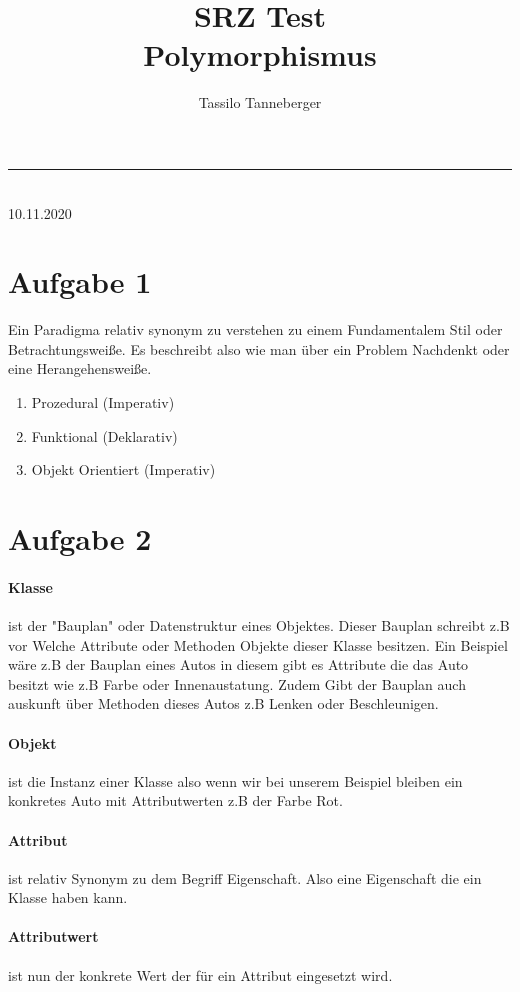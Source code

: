 \documentclass[12pt]{article}
\title{SRZ Test\\Polymorphismus}
\author{Tassilo Tanneberger}
\makeatletter
\newcommand{\linia}{\rule{\linewidth}{1pt}}
\renewcommand{\maketitle}{
\begin{center}
\huge \@title
\end{center}
\linia\\
{\large\@author\hfill 10.11.2020\\}}
\makeatother
\begin{document}
\maketitle

\section*{Aufgabe 1}

Ein Paradigma relativ synonym zu verstehen zu einem Fundamentalem Stil oder Betrachtungsweiße. Es beschreibt also wie man über ein Problem Nachdenkt oder eine Herangehensweiße.

\begin{enumerate}
	\item Prozedural (Imperativ)
	\item Funktional (Deklarativ)
	\item Objekt Orientiert (Imperativ)
\end{enumerate}


\section*{Aufgabe 2}

\paragraph*{Klasse} ist der "Bauplan" oder Datenstruktur eines Objektes. Dieser Bauplan schreibt z.B vor Welche Attribute oder Methoden Objekte dieser Klasse besitzen. Ein Beispiel wäre z.B der Bauplan eines Autos in diesem gibt es Attribute die das Auto besitzt wie z.B Farbe oder Innenaustatung. Zudem Gibt der Bauplan auch auskunft über Methoden dieses Autos z.B Lenken oder Beschleunigen. 

\paragraph*{Objekt} ist die Instanz einer Klasse also wenn wir bei unserem Beispiel bleiben ein konkretes Auto mit Attributwerten z.B der Farbe Rot. 

\paragraph*{Attribut} ist relativ Synonym zu dem Begriff Eigenschaft. Also eine Eigenschaft die ein Klasse haben kann.

\paragraph*{Attributwert} ist nun der konkrete Wert der für ein Attribut eingesetzt wird.
\end{document}
